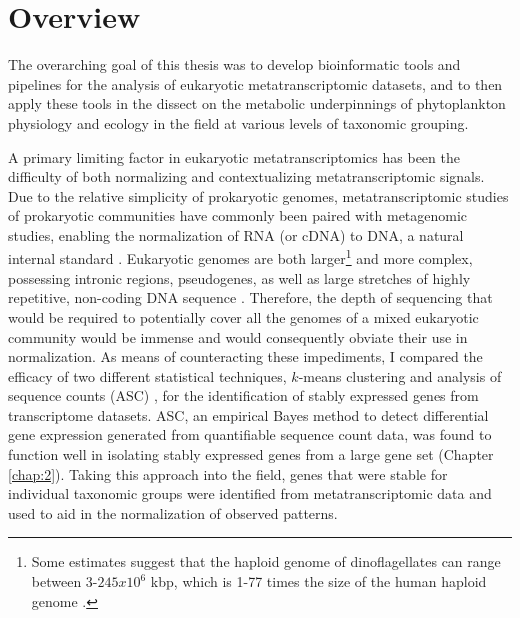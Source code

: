 \section{Overview}
The overarching goal of this thesis was to develop bioinformatic tools and pipelines for the analysis of eukaryotic metatranscriptomic datasets, and to then apply these tools in the dissect on the metabolic underpinnings of phytoplankton physiology and ecology in the field at various levels of taxonomic grouping. \par

A primary limiting factor in eukaryotic metatranscriptomics has been the difficulty of both normalizing and contextualizing metatranscriptomic signals. Due to the relative simplicity of prokaryotic genomes, metatranscriptomic studies of prokaryotic communities have commonly been paired with metagenomic studies, enabling the normalization of RNA (or cDNA) to DNA, a natural internal standard \citep{Frias-Lopez2008, McCarren2010, Shi2011}. Eukaryotic genomes are both larger\footnote{Some estimates suggest that the haploid genome of dinoflagellates can range between 3-$245 x 10^6$ kbp, which is 1-77 times the size of  the human haploid genome \citep{Hou2009}.} and more complex, possessing intronic regions, pseudogenes, as well as large stretches of highly repetitive, non-coding DNA sequence \citep{Taft2007}. Therefore, the depth of sequencing that would be required to potentially cover all the genomes of a mixed eukaryotic community would be immense and would consequently obviate their use in normalization. As means of counteracting these impediments, I compared the efficacy of two different statistical techniques, $k$-means clustering \citep{Hartigan1979} and analysis of sequence counts (ASC) \citep{Wu2010}, for the identification of stably expressed genes from transcriptome datasets. ASC, an empirical Bayes method to detect differential gene expression generated from quantifiable sequence count data, was found to function well in isolating stably expressed genes from a large gene set (Chapter \ref{chap:2}). Taking this approach into the field, genes that were stable for individual taxonomic groups were identified from metatranscriptomic data and used to aid in the normalization of observed patterns. \par

